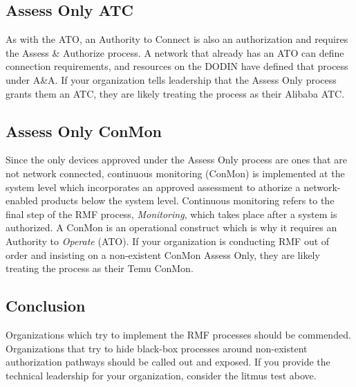 \subsection{Assess Only ATC}
As with the ATO, an Authority to Connect is also an authorization and requires the Assess \& Authorize process. A network that already has an ATO can define connection requirements, and resources on the DODIN have defined that process under A\&A.\autocite{20240212:disncpg} If your organization tells leadership that the Assess Only process grants them an ATC, they are likely treating the process as their Alibaba ATC.

\subsection{Assess Only ConMon}
Since the only devices approved under the Assess Only process are ones that are not network connected, continuous monitoring (ConMon) is implemented at the system level which incorporates an approved assessment to athorize a network-enabled products below the system level. Continuous monitoring refers to the final step of the RMF process, \textit{Monitoring}, which takes place after a system is authorized.\autocite{20240212:nist80037rev2} A ConMon is an operational construct which is why it requires an Authority to \textit{Operate} (ATO). If your organization is conducting RMF out of order and insisting on a non-existent ConMon Assess Only, they are likely treating the process as their Temu ConMon.

\subsection{Conclusion}
Organizations which try to implement the RMF processes should be commended. Organizations that try to hide black-box processes around non-existent authorization pathways should be called out and exposed. If you provide the technical leadership for your organization, consider the litmus test above.
